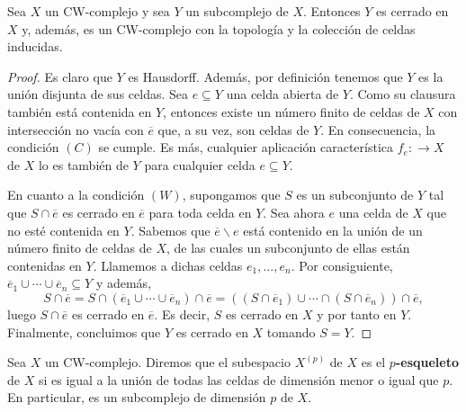\begin{teorema}
	Sea $X$ un CW-complejo y sea $Y$ un subcomplejo de $X$. Entonces $Y$ es
	cerrado en $X$ y, además, es un CW-complejo con la topología y la colección de
	celdas inducidas.
\end{teorema}
\begin{proof}
	Es claro que $Y$ es Hausdorff. Además, por definición tenemos que $Y$ es la unión
	disjunta de sus celdas. Sea $e \subseteq Y$ una celda abierta de $Y$. Como su clausura
	también está contenida en $Y$, entonces existe un número finito de celdas de
	$X$ con intersección no vacía con $\overline{e}$ que, a su vez, son celdas de
	$Y$. En consecuencia, la condición $(C)$ se cumple. Es más, cualquier
	aplicación característica $f_{e} : \to X$ de $X$ lo es también de $Y$ para
	cualquier celda $e \subseteq Y$.
	
	En cuanto a la condición $(W)$, supongamos que $S$ es un subconjunto de $Y$ tal
	que $S \cap \overline{e}$ es cerrado en $\overline{e}$ para toda celda en $Y$.
	Sea ahora $e$ una celda de $X$ que no esté contenida en $Y$. Sabemos que $\overline
	{e}\backslash e$ está contenido en la unión de un número finito de celdas de $X$,
	de las cuales un subconjunto de ellas están contenidas en $Y$. Llamemos a dichas
	celdas $e_{1}, \ldots, e_{n}$. Por consiguiente, $\overline{e}_{1} \cup \cdots
	\cup \overline{e}_{n} \subseteq Y$ y además,
	\[
	S \cap \overline{e}= S \cap (\overline{e}_{1} \cup \cdots \cup \overline{e}_{n}
	) \cap \overline{e}= \left( (S \cap \overline{e}_{1}) \cup \cdots \cap (S \cap
	\overline{e}_{n}) \right) \cap \overline{e},
	\]
	luego $S \cap \overline{e}$ es cerrado en $\overline{e}$. Es decir, $S$ es
	cerrado en $X$ y por tanto en $Y$. Finalmente, concluimos que $Y$ es cerrado
	en $X$ tomando $S = Y$.
\end{proof}

\begin{definicion}
	Sea $X$ un CW-complejo. Diremos que el subespacio $X^{(p)}$ de $X$ es el
	\textbf{$p$-esqueleto} de $X$ si es igual a la unión de todas las celdas de dimensión
	menor o igual que $p$. En particular, es un subcomplejo de dimensión $p$ de $X$.
\end{definicion}

